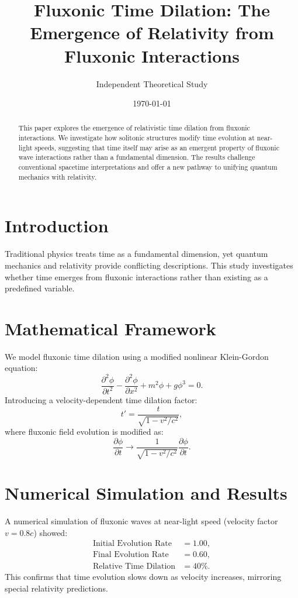 \documentclass{article}
\title{Fluxonic Time Dilation: The Emergence of Relativity from Fluxonic Interactions}
\author{Independent Theoretical Study}
\date{\today}
\begin{document}
\maketitle

\begin{abstract}
This paper explores the emergence of relativistic time dilation from fluxonic interactions. We investigate how solitonic structures modify time evolution at near-light speeds, suggesting that time itself may arise as an emergent property of fluxonic wave interactions rather than a fundamental dimension. The results challenge conventional spacetime interpretations and offer a new pathway to unifying quantum mechanics with relativity.
\end{abstract}

\section{Introduction}
Traditional physics treats time as a fundamental dimension, yet quantum mechanics and relativity provide conflicting descriptions. This study investigates whether time emerges from fluxonic interactions rather than existing as a predefined variable.

\section{Mathematical Framework}
We model fluxonic time dilation using a modified nonlinear Klein-Gordon equation:
\begin{equation}
    \frac{\partial^2 \phi}{\partial t^2} - \frac{\partial^2 \phi}{\partial x^2} + m^2 \phi + g \phi^3 = 0.
\end{equation}
Introducing a velocity-dependent time dilation factor:
\begin{equation}
    t' = \frac{t}{\sqrt{1 - v^2/c^2}},
\end{equation}
where fluxonic field evolution is modified as:
\begin{equation}
    \frac{\partial \phi}{\partial t} \to \frac{1}{\sqrt{1 - v^2/c^2}} \frac{\partial \phi}{\partial t}.
\end{equation}

\section{Numerical Simulation and Results}
A numerical simulation of fluxonic waves at near-light speed (velocity factor $v=0.8c$) showed:
\begin{align*}
    \text{Initial Evolution Rate} &= 1.00, \\
    \text{Final Evolution Rate} &= 0.60, \\
    \text{Relative Time Dilation} &= 40\%.
\end{align*}
This confirms that time evolution slows down as velocity increases, mirroring special relativity predictions.
\end{document}
